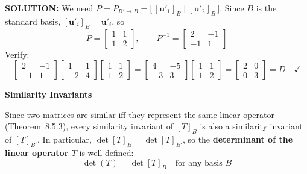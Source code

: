 \documentclass{article}
\newcommand{\redheading}[1]{{\vspace{2mm}\noindent\Large\bfseries\color{red!55!black} #1\par}\vspace{2mm}}
\begin{document}
\textbf{SOLUTION:} We need $P = P_{B'\to B} = \bigl[\,[\mathbf{u}'_1]_B\mid[\mathbf{u}'_2]_B\,\bigr]$.
Since $B$ is the standard basis, $[\mathbf{u}'_i]_B = \mathbf{u}'_i$, so
\[
  P = \begin{bmatrix}1&1\\1&2\end{bmatrix}, \qquad
  P^{-1} = \begin{bmatrix}2&-1\\-1&1\end{bmatrix}
\]
Verify:
\[
  \begin{bmatrix}2&-1\\-1&1\end{bmatrix}
  \begin{bmatrix}1&1\\-2&4\end{bmatrix}
  \begin{bmatrix}1&1\\1&2\end{bmatrix}
  = \begin{bmatrix}4&-5\\-3&3\end{bmatrix}
    \begin{bmatrix}1&1\\1&2\end{bmatrix}
  = \begin{bmatrix}2&0\\0&3\end{bmatrix} = D \quad\checkmark
\]

\vspace{2mm}
\redheading{Similarity Invariants}

Since two matrices are similar iff they represent the same linear operator (Theorem~8.5.3),
every similarity invariant of $[T]_B$ is also a similarity invariant of $[T]_{B'}$.
In particular, $\det[T]_B = \det[T]_{B'}$, so the \textbf{determinant of the linear
operator $T$} is well-defined:
\begin{equation}
  \det(T) = \det[T]_B \quad \text{for any basis $B$} \tag{12}
\end{equation}
\end{document}
